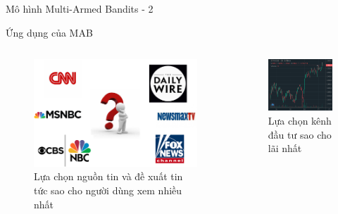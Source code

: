\begin{frame}{Mô hình Multi-Armed Bandits - 2}
    \begin{block}{Ứng dụng của MAB}
        \begin{columns}
            \begin{column}{0.45\textwidth}
                \begin{figure}
                    \centering
                    \includegraphics[width=0.7\linewidth]{figure/preliminary/news.eps}
                    \caption{Lựa chọn nguồn tin và đề xuất tin tức sao cho người dùng xem nhiều nhất}
                    \label{fig:preliminary:news}
                \end{figure}
            \end{column}
            \begin{column}{0.45\textwidth}
                \begin{figure}
                    \centering
                    \includegraphics[width=0.7\linewidth]{figure/preliminary/eth-usd.png}
                    \caption{Lựa chọn kênh đầu tư sao cho lãi nhất}
                    \label{fig:preliminary:invest}
                \end{figure}
            \end{column}
        \end{columns}
    \end{block}
\end{frame}
